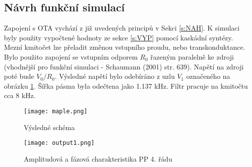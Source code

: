 \subsection{Návrh funkční simulací}
\noindent  Zapojení s OTA vychází z již uvedených principů v Sekci \ref{s:NAH}. K simulaci byly použity vypočtené hodnoty ze sekce \ref{s:VYP} pomocí kaskádní syntézy. Mezní kmitočet lze přeladit změnou vstupního proudu, nebo transkonduktance.
\noindent Bylo použito zapojení se vstupním odporem $R_0$ řazeným paralelně ke zdroji (vhodnější pro funkční simulaci - Schaumann (2001) str. 639). Napětí na zdroji poté bude $V_0/R_0$. Výsledné napětí bylo odebíráno z uzlu $V_1$ označeného na obrázku \ref{s:V1}. Šířka pásma byla odečtena jako 1.137 kHz. Filtr pracuje na kmitočtu cca 8 kHz.
\begin{figure}[h]
\centering
\texttt{[image: maple.png]}
\caption{Výsledné schéma\label{s:V1}}
\end{figure}
\begin{figure}[h]
\centering
\texttt{[image: output1.png]}
\caption{Amplitudová a fázová charakteristika PP 4. řádu}
\end{figure}
